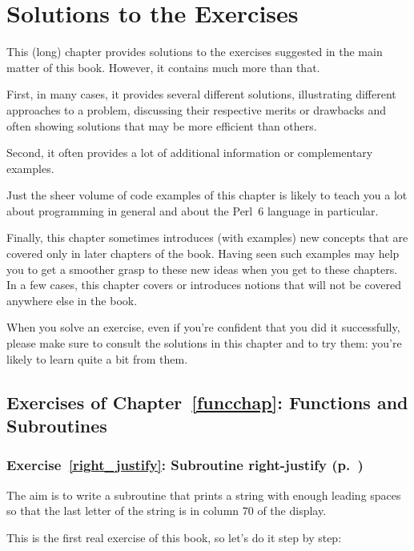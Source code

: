 \chapter{Solutions to the Exercises}

This (long) chapter provides solutions to the exercises 
suggested in the main matter of this book. However, it 
contains much more than that.

First, in many cases, it provides several different solutions, 
illustrating different approaches to a problem, discussing 
their respective merits or drawbacks and often 
showing solutions that may be more efficient than others.

Second, it often provides a lot of additional information 
or complementary examples.

Just the sheer volume of code examples of this chapter is 
likely to teach you a lot about programming in general and 
about the Perl~6 language in particular.

Finally, this chapter sometimes introduces (with examples) new 
concepts that are covered only in later chapters of the book. 
Having seen such examples may help you to get a smoother 
grasp to these new ideas when you get to these chapters. 
In a few cases, this chapter covers or introduces notions 
that will not be covered anywhere else in the book.

When you solve an exercise, even if you're confident that you 
did it successfully, please make sure to consult the solutions 
in this chapter and to try them: you're likely to learn quite 
a bit from them.

\section{Exercises of Chapter~\ref{funcchap}: Functions and Subroutines}

\subsection{Exercise~\ref{right_justify}: Subroutine right-justify (p.~\pageref{right_justify})}
\label{sol_right_justify}

The aim is to write a subroutine that prints a string
with enough leading spaces so that the last letter 
of the string is in column 70 of the display.

This is the first real exercise of this book, so let's 
do it step by step:

